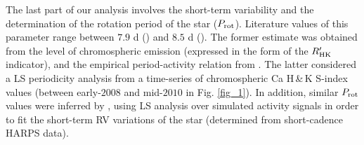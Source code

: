\documentclass[a4paper,fleqn,usenatbib]{mnras}
\begin{document}
The last part of our analysis involves the short-term variability and the determination of the rotation period of the star ($P_{\rm rot}$). Literature values of this parameter range between $7.9$ d () and $8.5$ d (). The former estimate was obtained from the level of chromospheric emission (expressed in the form of the $R^{\prime}_{\rm HK}$ indicator), and the empirical period-activity relation from . The latter considered a LS periodicity analysis from a time-series of chromospheric Ca H\,\&\,K S-index values (between early-$2008$ and mid-$2010$ in Fig. \ref{fig_1}). In addition, similar $P_{\rm rot}$ values were inferred by , using LS analysis over simulated activity signals in order to fit the short-term RV variations of the star (determined from short-cadence HARPS data).   
\end{document}
